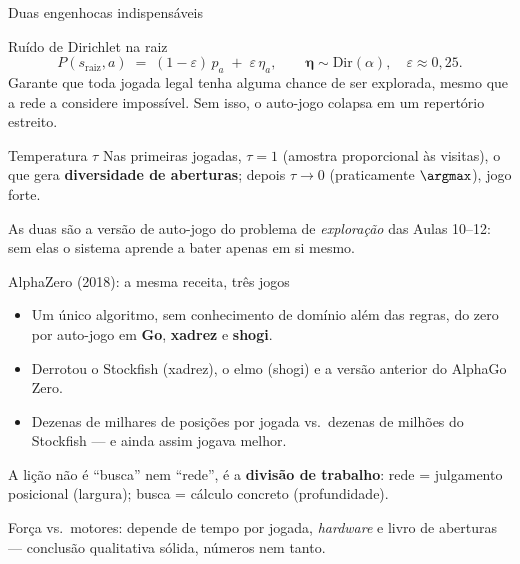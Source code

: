 \documentclass[aspectratio=169, 11pt]{beamer}
\newcommand{\raiz}{s_{\mathrm{raiz}}}
\begin{document}
\begin{frame}{Duas engenhocas indispensáveis}
  \vspace{-9pt}
  \begin{defbox}{Ruído de Dirichlet na raiz}
    \[
      P(\raiz, a) \;=\; (1-\varepsilon)\, p_a \;+\; \varepsilon\, \eta_a,
      \qquad \bm{\eta} \sim \mathrm{Dir}(\alpha), \quad \varepsilon \approx 0{,}25 .
    \]
    Garante que toda jogada legal tenha alguma chance de ser explorada, mesmo
    que a rede a considere impossível. Sem isso, o auto-jogo colapsa em um
    repertório estreito.
  \end{defbox}

  \pause
  \begin{defbox}{Temperatura $\tau$}
    Nas primeiras jogadas, $\tau = 1$ (amostra proporcional às visitas), o que
    gera \textbf{diversidade de aberturas}; depois $\tau \to 0$
    (praticamente $\argmax$), jogo forte.
  \end{defbox}

  \pause
  \begin{alertabox}
    As duas são a versão de auto-jogo do problema de \emph{exploração} das Aulas 10--12: sem elas o sistema aprende a bater apenas em si mesmo.
  \end{alertabox}
\end{frame}

\begin{frame}{AlphaZero (2018): a mesma receita, três jogos}
  \begin{itemize}
    \item Um único algoritmo, sem conhecimento de domínio além das regras, do zero por auto-jogo em \textbf{Go}, \textbf{xadrez} e \textbf{shogi}.
    \item Derrotou o Stockfish (xadrez), o elmo (shogi) e a versão anterior do AlphaGo Zero.
    \item Dezenas de milhares de posições por jogada vs.\ dezenas de milhões do Stockfish --- e ainda assim jogava melhor.
  \end{itemize}

  \pause
  \begin{ideiabox}
    A lição não é ``busca'' nem ``rede'', é a \textbf{divisão de trabalho}: rede = julgamento posicional (largura); busca = cálculo concreto (profundidade).
  \end{ideiabox}

  \pause
  \begin{alertabox}
    Força vs.\ motores: depende de tempo por jogada, \emph{hardware} e livro de aberturas — conclusão qualitativa sólida, números nem tanto.
  \end{alertabox}
\end{frame}
\end{document}
